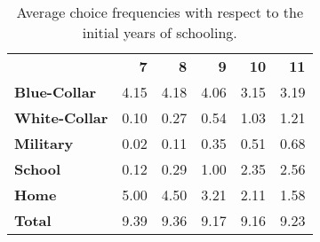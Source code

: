 \begin{ThreePartTable}

	\begin{longtable}[c]{@{}lrrrrr@{}}
		\caption{Average choice frequencies with respect to the initial years of schooling.}
		\label{tab:InitialSchoolingActivity}

		\setlength\extrarowheight{2.5pt}
		
		\\
		\toprule
		
   &	\textbf{7}	&	\textbf{8}	&	\textbf{9}	&	\textbf{10}	&	\textbf{11}	\\ \midrule
		\endfirsthead
\textbf{Blue-Collar}	&	4.15	&	4.18	&	4.06	&	3.15	&	3.19	\\
\textbf{White-Collar}	&	0.10	&	0.27	&	0.54	&	1.03	&	1.21	\\
\textbf{Military}&	0.02	&	0.11	&	0.35	&	0.51	&	0.68	\\
\textbf{School}	&	0.12	&	0.29	&	1.00	&	2.35	&	2.56	\\
\textbf{Home}	&	5.00	&	4.50	&	3.21	&	2.11	&	1.58	\\
\textbf{Total}	&	9.39	&	9.36	&	9.17	&	9.16	&	9.23	\\



  \bottomrule
	\end{longtable}
\end{ThreePartTable}

